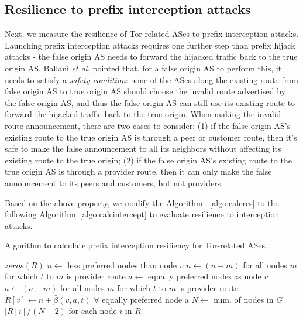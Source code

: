 \subsection{Resilience to prefix interception attacks}
\label{interception_methodology}
Next, we measure the resilience of Tor-related ASes to prefix interception attacks. Launching prefix interception attacks requires one further step than prefix hijack attacks - the false origin AS needs to forward the hijacked traffic back to the true origin AS. Ballani \emph{et al.} \cite{ballani2007study} pointed that, for a false origin AS to perform this, it needs to satisfy a \emph{safety condition}: none of the ASes along the existing route from false origin AS to true origin AS should choose the invalid route advertised by the false origin AS, and thus the false origin AS can still use its existing route to forward the hijacked traffic back to the true origin. When making the invalid route announcement, there are two cases to consider: (1) if the false origin AS's existing route to the true origin AS is through a peer or customer route, then it's safe to make the false announcement to all its neighbors without affecting its existing route to the true origin; (2) if the false origin AS's existing route to the true origin AS is through a provider route, then it can only make the false announcement to its peers and customers, but not providers. 

Based on the above property, we modify the Algorithm ~\ref{algo:calcres} to the following Algorithm~\ref{algo:calcintercept} to evaluate resilience to interception attacks. 

\begin{algorithm}
\caption{Algorithm to calculate prefix interception resiliency for Tor-related ASes.}
\label{algo:calcintercept}
\begin{algorithmic}
    \State {}
    \State $zeros(R)$
		\State $n \gets$ less preferred nodes than node $v$
			\State $n \gets (n - m)$ for all nodes $m$ for which $t$ to $m$ is provider route
		\EndIf
		\State $a \gets$ equally preferred nodes as node $v$
			\State $a \gets (a - m)$ for all nodes $m$ for which $t$ to $m$ is provider route
		\EndIf
		\State $R[v] \gets n + \bar{\beta}(v,a,t)$ $\forall$ equally preferred node a
	\EndIf
    \EndFor
    \State $N \gets$ num. of nodes in $G$
    \State \Return $[R[i] / (N-2)$ for each node $i$ in $R]$
\EndFunction
\end{algorithmic}
\end{algorithm}

